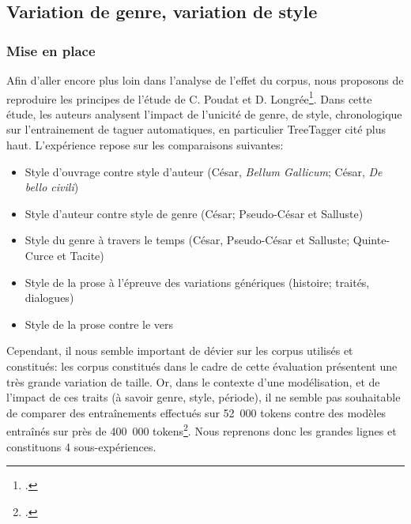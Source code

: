 \subsection{Variation de genre, variation de style}
\label{lemmatisation:extensibilite:prose-vers}

\subsubsection{Mise en place}

Afin d'aller encore plus loin dans l'analyse de l'effet du corpus, nous proposons de reproduire les principes de l'étude de C. Poudat et D. Longrée\footcite{poudat2009variations}. Dans cette étude, les auteurs analysent l'impact de l'unicité de genre, de style, chronologique sur l'entrainement de taguer automatiques, en particulier TreeTagger cité plus haut. L'expérience repose sur les comparaisons suivantes:
\begin{itemize}
    \item Style d'ouvrage contre style d'auteur (César, \textit{Bellum Gallicum}; César, \textit{De bello civili})
    \item Style d'auteur contre style de genre (César; Pseudo-César et Salluste)
    \item Style du genre à travers le temps (César, Pseudo-César et Salluste; Quinte-Curce et Tacite)
    \item Style de la prose à l'épreuve des variations génériques (histoire; traités, dialogues)
    \item Style de la prose contre le vers
\end{itemize}{}

Cependant, il nous semble important de dévier sur les corpus utilisés et constitués: les corpus constitués dans le cadre de cette évaluation présentent une très grande variation de taille. Or, dans le contexte d'une modélisation, et de l'impact de ces traits (à savoir genre, style, période), il ne semble pas souhaitable de comparer des entraînements effectués sur 52~000 tokens contre des modèles entraînés sur près de 400~000 tokens\footcite[par exemple, p.~135, 2.~2.~4]{poudat2009variations}. Nous reprenons donc les grandes lignes et constituons 4 sous-expériences.

